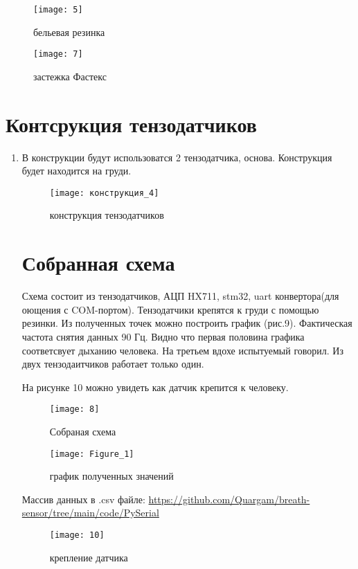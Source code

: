\begin{enumerate}
\newpage

\begin{figure}[h]
\begin{center}
\begin{minipage}[h]{0.4\linewidth}
\texttt{[image: 5]}
\caption{бельевая резинка} %
\label{ris:experimoriginal} %
\end{minipage}
\hfill
\begin{minipage}[h]{0.4\linewidth}
\texttt{[image: 7]}
\caption{застежка Фастекс}
\label{ris:experimcoded}
\end{minipage}
\end{center}
\end{figure}
\end{enumerate}
\section{Контсрукция тензодатчиков}
\begin{enumerate}

\item В конструкции будут использоватся 2 тензодатчика, основа. Конструкция будет находится на груди.

	\begin{figure}[h]
		\centering
		\texttt{[image: конструкция\_4]}
		\caption{конструкция тензодатчиков}
	\end{figure}
\section{Собранная схема}

Схема состоит из тензодатчиков, АЦП HX711, stm32, uart конвертора(для оющения с  COM-портом). Тензодатчики крепятся к груди с помощью резинки. Из полученных точек можно построить график (рис.9). Фактическая частота снятия данных 90 Гц. Видно что первая половина графика соответсвует дыханию человека. На третьем вдохе испытуемый говорил. Из двух тензодаитчиков работает только один.

На рисунке 10 можно увидеть как датчик крепится к человеку.

	\begin{figure}[h]
		\centering
		\texttt{[image: 8]}
		\caption{Собраная схема}
	\end{figure}

	\begin{figure}[h]
		\centering
		\texttt{[image: Figure\_1]}
		\caption{график полученных значений}
	\end{figure}	
	
Массив данных в .csv файле: 
\url{https://github.com/Quargam/breath-sensor/tree/main/code/PySerial}	

	\begin{figure}[h]
		\centering
		\texttt{[image: 10]}
		\caption{крепление датчика}
	\end{figure}	
		
	

\end{enumerate} 
